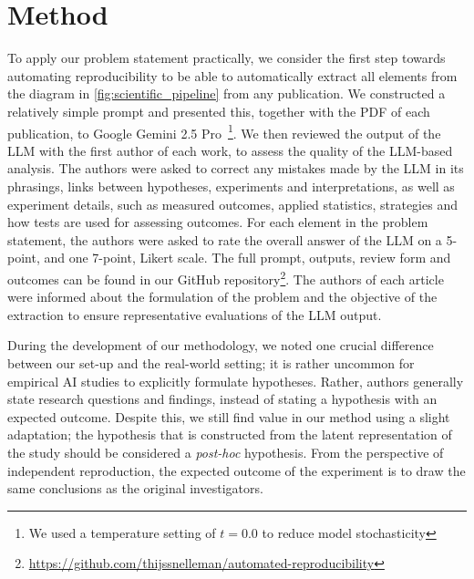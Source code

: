 \documentclass[letterpaper]{article} %
\begin{document}
\section{Method}
\label{sec:method}
To apply our problem statement practically, we consider the first step towards automating reproducibility to be able to automatically extract all elements from the diagram in \autoref{fig:scientific_pipeline} from any publication. 
We constructed a relatively simple prompt and presented this, together with the PDF of each publication, to Google Gemini 2.5 Pro~\cite{comanici2025gemini}\footnote{We used a  temperature setting of $t = 0.0$ to reduce model stochasticity}. We then reviewed the output of the LLM with the first author of each work, to assess the quality of the LLM-based analysis. 
The authors were asked to correct any mistakes made by the LLM in its phrasings, links between hypotheses, experiments and interpretations, as well as experiment details, such as measured outcomes, applied statistics, strategies and how tests are used for assessing outcomes. 
For each element in the problem statement, the authors were asked to rate the overall answer of the LLM on a 5-point, and one 7-point, Likert scale. The full prompt, outputs, review form and outcomes can be found in our GitHub repository\footnote{\href{https://github.com/thijssnelleman/automated-reproducibility}{https://github.com/thijssnelleman/automated-reproducibility}}. 
The authors of each article were informed about the formulation of the problem and the objective of the extraction to ensure representative evaluations of the LLM output.


During the development of our methodology, we noted one crucial difference between our set-up and the real-world setting; it is rather uncommon for empirical AI studies to explicitly formulate hypotheses. Rather, authors generally state research questions and findings, instead of stating a hypothesis with an expected outcome. Despite this, we still find value in our method using a slight adaptation; the hypothesis that is constructed from the latent representation of the study should be considered a \emph{post-hoc} hypothesis. From the perspective of independent reproduction, the expected outcome of the experiment is to draw the same conclusions as the original investigators.
\end{document}
